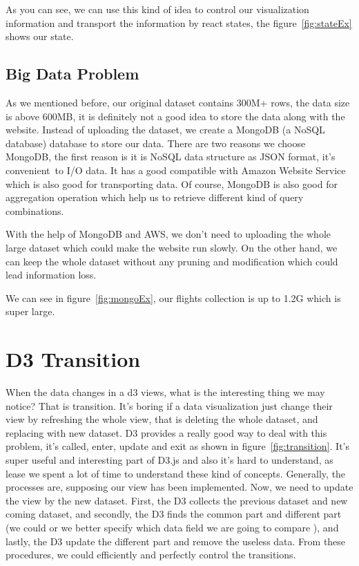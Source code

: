 As you can see, we can use this kind of idea to control our visualization information and transport the information by react states, the figure~\ref{fig:stateEx} shows our state. 
\stateEx



\subsection{Big Data Problem}

As we mentioned before, our original dataset contains 300M+ rows, the data size is above 600MB, it is definitely not a good idea to store the data along with the website. Instead of uploading the dataset, we create a MongoDB (a NoSQL database) database to store our data. There are two reasons we choose MongoDB, the first reason is it is NoSQL data structure as JSON format, it's convenient to I/O data. It has a good compatible with Amazon Website Service which is also good for transporting data. Of course, MongoDB is also good for aggregation operation which help us to retrieve different kind of query combinations. 

With the help of MongoDB and AWS, we don't need to uploading the whole large dataset which could make the website run slowly. On the other hand, we can keep the whole dataset without any pruning and modification which could lead information loss.

We can see in figure~\ref{fig:mongoEx}, our flights collection is up to 1.2G which is super large.
\mongodbEx

\section{D3 Transition}
When the data changes in a d3 views, what is the interesting thing we may notice? That is transition. It's boring if a data visualization just change their view by refreshing the whole view, that is deleting the whole dataset, and replacing with new dataset. D3 provides a really good way to deal with this problem, it's called, enter, update and exit as shown in figure~\ref{fig:transition}. It's super useful and interesting part of D3.js and also it's hard to understand, as lease we spent a lot of time to understand these kind of concepts. Generally, the processes are, supposing our view has been implemented. Now, we need to update the view by the new dataset. First, the D3 collects the previous dataset and new coming dataset, and secondly, the D3 finds the common part and different part (we could or we better specify which data field we are going to compare ), and lastly, the D3 update the different part and remove the useless data. From these procedures, we could efficiently and perfectly control the transitions. 
\transition
